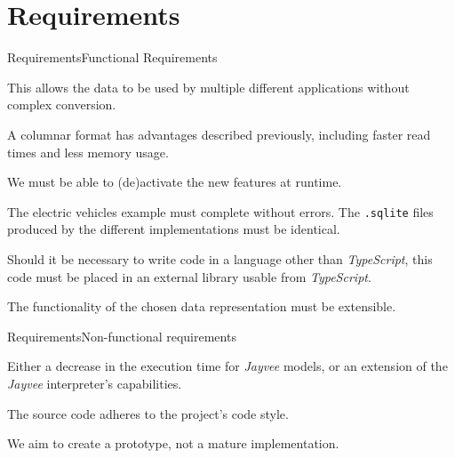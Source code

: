 \section{Requirements}
\begin{frame}[t]{Requirements}{Functional Requirements}
	\begin{description}[<+(1)->]
		\item[interoperability] This allows the data to be used by multiple different applications without complex conversion.
		\item[columnar] A columnar format has advantages described previously, including faster read times and less memory usage.
		\item[feature toggle] We must be able to (de)activate the new features at runtime.
		\item[compatibility]  The electric vehicles example must complete without errors.
		      The \Verb|.sqlite| files produced by the different implementations must be identical.
		\item[modularization] Should it be necessary to write code in a language other than \emph{TypeScript}, this code must be placed in an external library usable from \emph{TypeScript}.
		\item[extensibility] The functionality of the chosen data representation must be extensible.
	\end{description}
\end{frame}
\begin{frame}[t]{Requirements}{Non-functional requirements}
	\begin{description}[<+(1)->]
		\item[performance] Either a decrease in the execution time for \emph{Jayvee} models, or an extension of the \emph{Jayvee} interpreter's capabilities.
		\item[code style] The source code adheres to the project's code style.
		\item[maturity] We aim to create a prototype, not a mature implementation.
	\end{description}
\end{frame}

